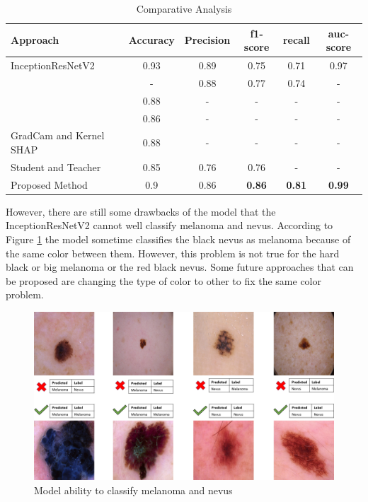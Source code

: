 \documentclass[sensors,article,submit,pdftex,moreauthors]{Definitions/mdpi}
\begin{document}
	\FloatBarrier
	\begin{table}[H]
		\centering
		\begin{tabular}{| p{4cm} | c | c | c | c | c |}
			\hline
			Approach & Accuracy & Precision & f1-score & recall & auc-score\\
			\hline
			InceptionResNetV2\cite{03358} & 0.93 & 0.89 & 0.75 & 0.71 & 0.97\\
			\hline
			\cite{03798} & - & 0.88 & 0.77 & 0.74 & - \\
			\hline
			\cite{09418} & 0.88 & - & - & - & - \\
			\hline
			\cite{01284} & 0.86 & - & - & - & - \\
			\hline
			GradCam and Kernel SHAP\cite{06612} & 0.88 & - & - & - & - \\
			\hline
			Student and Teacher\cite{03225} & 0.85 & 0.76 & 0.76 & - & - \\
			\hline
			Proposed Method & 0.9	& 0.86 &\textbf{0.86} & \textbf{0.81} & \textbf{0.99}\\
			\hline
		\end{tabular}
		\caption{Comparative Analysis}
		\label{table:comparative-analysis}
	\end{table} 
	
	However, there are still some drawbacks of the model that the InceptionResNetV2 cannot well classify melanoma and nevus. According to Figure \ref{fig:nevusVSmela} the model sometime classifies the black nevus as melanoma because of the same color between them. However, this problem is not true for the hard black or big melanoma or the red black nevus. Some future approaches that can be proposed are changing the type of color to other to fix the same color problem.    
	
	\begin{figure}[H]
		\centering
		\includegraphics[width=1\linewidth]{Definitions/img_class_nevus_mela}
		\caption{Model ability to classify melanoma and nevus}
		\label{fig:nevusVSmela}
	\end{figure}
	
\end{document}
